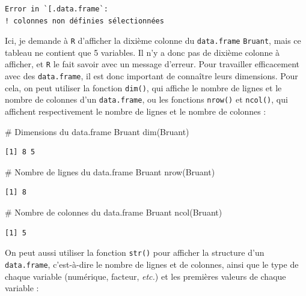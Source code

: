 \documentclass[
  a4paper,
  DIV=11,
  numbers=noendperiod,
  oneside]{scrreprt}
\newenvironment{Shaded}{}{}
\newcommand{\CommentTok}[1]{\textcolor[rgb]{0.42,0.45,0.49}{#1}}
\newcommand{\FunctionTok}[1]{\textcolor[rgb]{0.44,0.26,0.76}{#1}}
\newcommand{\NormalTok}[1]{\textcolor[rgb]{0.14,0.16,0.18}{#1}}
\begin{document}
\begin{verbatim}
Error in `[.data.frame`:
! colonnes non définies sélectionnées
\end{verbatim}

Ici, je demande à \texttt{R} d'afficher la dixième colonne du
\texttt{data.frame} \texttt{Bruant}, mais ce tableau ne contient que 5
variables. Il n'y a donc pas de dixième colonne à afficher, et
\texttt{R} le fait savoir avec un message d'erreur. Pour travailler
efficacement avec des \texttt{data.frame}, il est donc important de
connaître leurs dimensions. Pour cela, on peut utiliser la fonction
\texttt{dim()}, qui affiche le nombre de lignes et le nombre de colonnes
d'un \texttt{data.frame}, ou les fonctions \texttt{nrow()} et
\texttt{ncol()}, qui affichent respectivement le nombre de lignes et le
nombre de colonnes :

\begin{Shaded}
\begin{Highlighting}[]
\CommentTok{\# Dimensions du data.frame Bruant}
\FunctionTok{dim}\NormalTok{(Bruant)}
\end{Highlighting}
\end{Shaded}

\begin{verbatim}
[1] 8 5
\end{verbatim}

\begin{Shaded}
\begin{Highlighting}[]
\CommentTok{\# Nombre de lignes du data.frame Bruant}
\FunctionTok{nrow}\NormalTok{(Bruant)}
\end{Highlighting}
\end{Shaded}

\begin{verbatim}
[1] 8
\end{verbatim}

\begin{Shaded}
\begin{Highlighting}[]
\CommentTok{\# Nombre de colonnes du data.frame Bruant}
\FunctionTok{ncol}\NormalTok{(Bruant)}
\end{Highlighting}
\end{Shaded}

\begin{verbatim}
[1] 5
\end{verbatim}

On peut aussi utiliser la fonction \texttt{str()} pour afficher la
structure d'un \texttt{data.frame}, c'est-à-dire le nombre de lignes et
de colonnes, ainsi que le type de chaque variable (numérique, facteur,
\emph{etc.}) et les premières valeurs de chaque variable :
\end{document}

